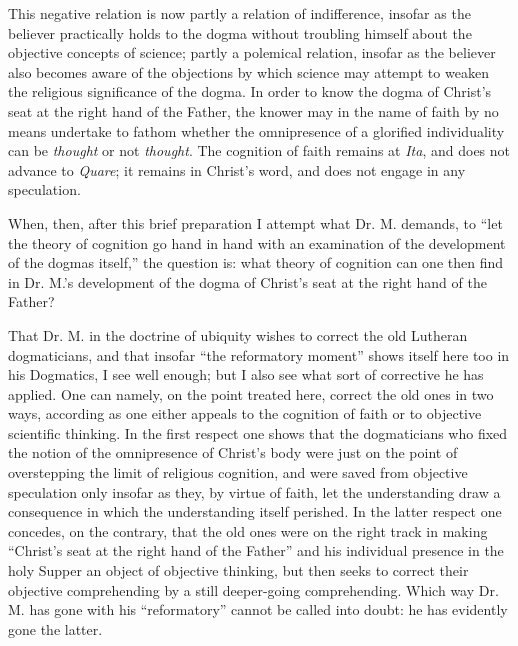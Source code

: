 \documentclass[12pt,a4paper,openany]{book}
\newcommand{\opage}[1]{\marginnote{\footnotesize\textit{[#1]}}}
\begin{document}
\setcounter{footnote}{0}%
\opage{36}This negative relation is now partly a relation of
indifference, insofar as the believer practically holds to the dogma
without troubling himself about the objective concepts of science;
partly a polemical relation, insofar as the believer also
becomes aware of the objections by which science
may attempt to weaken the religious significance of the dogma. In order
to know the dogma of Christ's seat at the right hand of the Father,
the knower may in the name of faith by no means undertake
to fathom whether the omnipresence of a glorified individuality
can be \emph{thought} or not \emph{thought}. The cognition of faith
remains at \textit{Ita}, and does not advance to \textit{Quare};
it remains in Christ's word, and does not engage in any
speculation.

When, then, after this brief preparation I attempt
what Dr. M. demands, to ``let the theory of cognition go hand
in hand with an examination of the development of the dogmas itself,'' the
question is: what theory of cognition can one then find in Dr.
M.'s development of the dogma of Christ's seat at the right hand of the
Father?

That Dr. M. in the doctrine of ubiquity wishes to correct the old
Lutheran dogmaticians, and that insofar ``the reformatory
moment'' shows itself here too in his Dogmatics, I see
well enough; but I also see what sort of corrective he
has applied. One can namely, on the point treated here,
correct the old ones in two ways, according as one either
appeals to the cognition of faith or to objective
scientific thinking. In the first respect one shows that
the dogmaticians who fixed the notion of the omnipresence of Christ's body
were just on the point of overstepping
the limit of religious cognition, and were saved from objective speculation only insofar as
\setcounter{footnote}{0}%
\opage{37}they, by virtue of faith,
let the understanding draw a consequence in which
the understanding itself perished. In the latter respect one concedes,
on the contrary, that the old ones were on the right track in
making ``Christ's seat at the right hand of the Father'' and his individual
presence in the holy Supper an object of
objective thinking, but then seeks to correct their objective
comprehending by a still deeper-going comprehending.
Which way Dr. M. has gone with his ``reformatory'' cannot
be called into doubt: he has evidently gone the latter.
\end{document}
